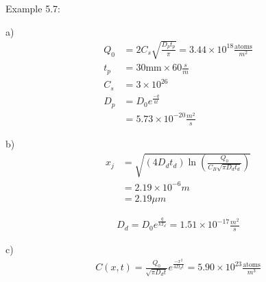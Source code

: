 \documentclass{article}
\begin{document}
Example 5.7:

a)
\begin{equation}
    \begin{split}
        Q_0 &= 2C_s\sqrt{\frac{D_p t_p}{\pi}} = 3.44 \times 10^{18} \frac{\text{atoms}}{m^2} \\
        t_p &= 30\text{mm} \times 60 \frac{s}{m} \\
        C_s &= 3 \times 10^{26} \\
        D_p &= D_0 e^{\frac{-q}{kt}} \\
        &= 5.73 \times 10^{-20} \frac{m^2}{s}
    \end{split}
\end{equation}

b)
\begin{equation}
    \begin{split}
        x_j &= \sqrt{(4 D_d t_d) \ln (\frac{Q_0}{C_B \sqrt{\pi D_d t_d}})} \\ 
        &= 2.19 \times 10^{-6} m \\
        &= 2.19 \mu m
    \end{split}
\end{equation}

\begin{equation}
    \begin{split}
        D_d = D_0 e^{\frac{q}{kT_d}} = 1.51 \times 10^{-17}\frac{m^2}{s}
    \end{split}
\end{equation}

c)
\begin{equation}
    \begin{split}
        C(x, t) = \frac{Q_0}{\sqrt{\pi D_d t}} e^{\frac{-x^2}{4D_d t}} = 5.90 \times 10^23 \frac{\text{atoms}}{m^3}
    \end{split}
\end{equation}
\end{document}
